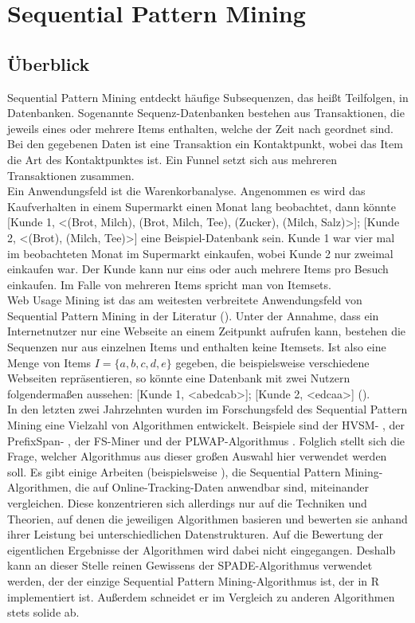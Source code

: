 \section{Sequential Pattern Mining}\label{spm}

\subsection{Überblick}

Sequential Pattern Mining entdeckt häufige Subsequenzen, das heißt Teilfolgen, in Datenbanken. Sogenannte Sequenz-Datenbanken bestehen aus Transaktionen, die jeweils eines oder mehrere Items enthalten, welche der Zeit nach geordnet sind. Bei den gegebenen Daten ist eine Transaktion ein Kontaktpunkt, wobei das Item die Art des Kontaktpunktes ist. Ein Funnel setzt sich aus mehreren Transaktionen zusammen.\\
Ein Anwendungsfeld ist die Warenkorbanalyse. Angenommen es wird das Kaufverhalten in einem Supermarkt einen Monat lang beobachtet, dann könnte [Kunde 1, <(Brot, Milch), (Brot, Milch, Tee), (Zucker), (Milch, Salz)>]; [Kunde 2, <(Brot), (Milch, Tee)>] eine Beispiel-Datenbank sein. Kunde 1 war vier mal im beobachteten Monat im Supermarkt einkaufen, wobei Kunde 2 nur zweimal einkaufen war. Der Kunde kann nur eins oder auch mehrere Items pro Besuch einkaufen. Im Falle von mehreren Items spricht man von Itemsets.\\
Web Usage Mining ist das am weitesten verbreitete Anwendungsfeld von Sequential Pattern Mining in der Literatur (\cite{lu_ezeife,wang_han,goethals}). Unter der Annahme, dass ein Internetnutzer nur eine Webseite an einem Zeitpunkt aufrufen kann, bestehen die Sequenzen nur aus einzelnen Items und enthalten keine Itemsets. Ist also eine Menge von Items $I = \{a, b, c, d, e\}$ gegeben, die beispielsweise verschiedene Webseiten repräsentieren, so könnte eine Datenbank mit zwei Nutzern folgendermaßen aussehen: [Kunde 1, <abedcab>]; [Kunde 2, <edcaa>] (\cite{taxonomy}).\\
In den letzten zwei Jahrzehnten wurden im Forschungsfeld des Sequential Pattern Mining eine Vielzahl von Algorithmen entwickelt. Beispiele sind der HVSM- \cite{hvsm}, der PrefixSpan- \cite{prefixspan}, der FS-Miner \cite{fsminer} und der PLWAP-Algorithmus \cite{plwap}. Folglich stellt sich die Frage, welcher Algorithmus aus dieser großen Auswahl hier verwendet werden soll. Es gibt einige Arbeiten (beispielsweise \cite{spm_taxonomy1,spm_taxonomy2,spm_taxonomy3,spm_taxonomy4}), die Sequential Pattern Mining-Algorithmen, die auf Online-Tracking-Daten anwendbar sind, miteinander vergleichen. Diese konzentrieren sich allerdings nur auf die Techniken und Theorien, auf denen die jeweiligen Algorithmen basieren und bewerten sie anhand ihrer Leistung bei unterschiedlichen Datenstrukturen. Auf die Bewertung der eigentlichen Ergebnisse der Algorithmen wird dabei nicht eingegangen. Deshalb kann an dieser Stelle reinen Gewissens der SPADE-Algorithmus \cite{spade} verwendet werden, der der einzige Sequential Pattern Mining-Algorithmus ist, der in R implementiert ist. Außerdem schneidet er im Vergleich zu anderen Algorithmen stets solide ab.

